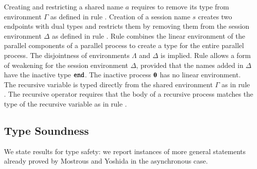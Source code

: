Creating and restricting a
shared name $a$ requires to remove
its type from environment $\Gamma$ as defined in 
rule . 
Creation of a session name $s$
creates two endpoints with dual types and restricts
them by removing them from the session environment
$\Delta$ as defined in rule . 
Rule  combines the linear environment of
the parallel components of a parallel process
to create a type for the entire parallel process.
The disjointness of environments $\Lambda$ and $\Delta$
is implied. Rule  allows a form of weakening 
for the session environment $\Delta$, provided that
the names added in $\Delta$ have the inactive
type $\mathtt{end}$. The inactive process $\mathbf{0}$ has no
linear environment. The recursive variable is typed
directly from the shared environment $\Gamma$ as
in rule .
The recursive operator requires that the body of
a recursive process matches the type of the recursive
variable as in rule .

%


\subsection{Type Soundness}
We state results for type safety:
we report instances of more general statements already proved by
Mostrous and Yoshida in the asynchronous case.

